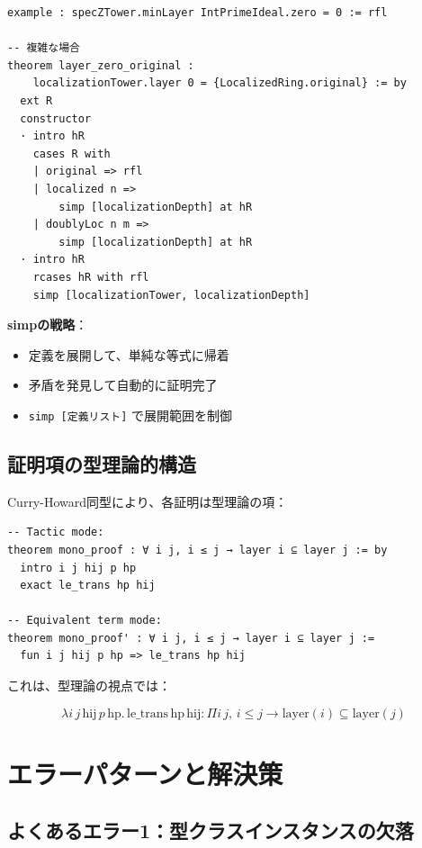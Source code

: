 \documentclass{ltjsarticle}
\begin{document}
\begin{lstlisting}[caption=simpの効果的な使用]
example : specZTower.minLayer IntPrimeIdeal.zero = 0 := rfl

-- 複雑な場合
theorem layer_zero_original :
    localizationTower.layer 0 = {LocalizedRing.original} := by
  ext R
  constructor
  · intro hR
    cases R with
    | original => rfl
    | localized n =>
        simp [localizationDepth] at hR
    | doublyLoc n m =>
        simp [localizationDepth] at hR
  · intro hR
    rcases hR with rfl
    simp [localizationTower, localizationDepth]
\end{lstlisting}

\textbf{simpの戦略}：
\begin{itemize}
\item 定義を展開して、単純な等式に帰着
\item 矛盾を発見して自動的に証明完了
\item \texttt{simp [定義リスト]} で展開範囲を制御
\end{itemize}

\subsection{証明項の型理論的構造}

Curry-Howard同型により、各証明は型理論の項：

\begin{lstlisting}[caption=証明項の明示的構成]
-- Tactic mode:
theorem mono_proof : ∀ i j, i ≤ j → layer i ⊆ layer j := by
  intro i j hij p hp
  exact le_trans hp hij

-- Equivalent term mode:
theorem mono_proof' : ∀ i j, i ≤ j → layer i ⊆ layer j :=
  fun i j hij p hp => le_trans hp hij
\end{lstlisting}

これは、型理論の視点では：

\begin{equation}
\lambda i\, j\, \text{hij}\, p\, \text{hp}.\, \text{le\_trans}\, \text{hp}\, \text{hij} : \Pi i\, j,\, i \le j \to \text{layer}(i) \subseteq \text{layer}(j)
\end{equation}

\section{エラーパターンと解決策}

\subsection{よくあるエラー1：型クラスインスタンスの欠落}
\end{document}
